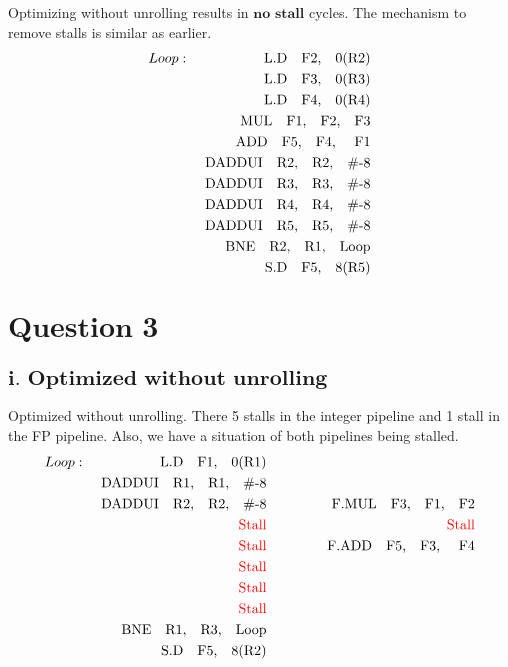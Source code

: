 \documentclass{tufte-handout}
\begin{document}
		Optimizing without unrolling results in $\textbf{no stall}$ cycles. The mechanism to remove stalls is similar as earlier.
		\begin{eqnarray*}
			Loop : & & \mbox{ L.D\quad F2,\quad 0(R2)} \\
			       & & \mbox{ L.D\quad F3,\quad 0(R3)} \\
			       & & \mbox{ L.D\quad F4,\quad 0(R4)} \\
			       & & \mbox{ MUL\quad F1,\quad F2,\quad F3} \\
			       & & \mbox{ ADD\quad F5,\quad F4, \quad F1} \\
			       & & \mbox{ DADDUI\quad R2,\quad R2,\quad \#-8} \\
			       & & \mbox{ DADDUI\quad R3,\quad R3,\quad \#-8} \\
			       & & \mbox{ DADDUI\quad R4,\quad R4,\quad \#-8} \\
			       & & \mbox{ DADDUI\quad R5,\quad R5,\quad \#-8} \\
			       & & \mbox{ BNE\quad R2,\quad R1,\quad Loop} \\
			       & & \mbox{ S.D\quad F5,\quad 8(R5)} \\
		\end{eqnarray*}


\section{$\textbf{Question 3}$}
	\subsection{$\textbf{i. Optimized without unrolling}$}
		Optimized without unrolling. There 5 stalls in the integer pipeline and 1 stall in the FP pipeline. Also, we have a situation of both pipelines being stalled.
		\begin{alignat*}{3}
			Loop : & & \mbox{ L.D\quad F1,\quad 0(R1)}            \quad\quad\quad       &&      \\
			       & & \mbox{ DADDUI\quad R1,\quad R1,\quad \#-8} \quad\quad\quad      &&      \\
			       & & \mbox{ DADDUI\quad R2,\quad R2,\quad \#-8}  \quad\quad\quad     &&  \mbox{F.MUL\quad F3,\quad F1,\quad F2}    \\
			       & & \mbox{ \textcolor{red}{Stall}}  \quad\quad\quad      &&  \mbox{ \textcolor{red}{Stall}}     \\
			       & & \mbox{ \textcolor{red}{Stall}}  \quad\quad\quad      &&  \mbox{ F.ADD\quad F5,\quad F3, \quad F4}     \\
			       & & \mbox{ \textcolor{red}{Stall}}  \quad\quad\quad      && \\ 
			       & & \mbox{ \textcolor{red}{Stall}}  \quad\quad\quad      && \\
			       & & \mbox{ \textcolor{red}{Stall}}  \quad\quad\quad      && \\
			       & & \mbox{ BNE\quad R1,\quad R3,\quad Loop}  \quad\quad\quad      &&  \\
			       & & \mbox{ S.D\quad F5,\quad 8(R2)}  \quad\quad\quad      &&   \\
		\end{alignat*}
\end{document}
